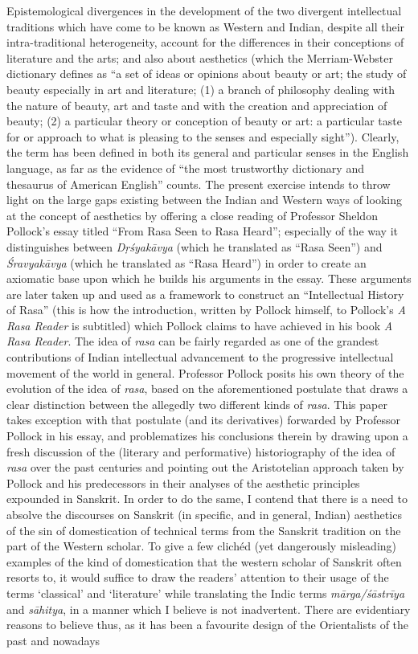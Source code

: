Epistemological divergences in the development of the two divergent intellectual traditions which have come to be known as Western and Indian, despite all their intra-traditional heterogeneity, account for the differences in their conceptions of literature and the arts; and also about aesthetics (which the Merriam-Webster dictionary defines as “a set of ideas or opinions about beauty or art; the study of beauty especially in art and literature; (1) a branch of philosophy dealing with the nature of beauty, art and taste and with the creation and appreciation of beauty; (2) a particular theory or conception of beauty or art: a particular taste for or approach to what is pleasing to the senses and especially sight”). Clearly, the term has been defined in both its general and particular senses in the English language, as far as the evidence of “the most trustworthy dictionary and thesaurus of American English” counts. The present exercise intends to throw light on the large gaps existing between the Indian and Western ways of looking at the concept of aesthetics by offering a close reading of Professor Sheldon Pollock’s essay titled “From Rasa Seen to Rasa Heard”; especially of the way it distinguishes between \textsl{Dṛśyakāvya} (which he translated as “Rasa Seen”) and \textsl{Śravyakāvya} (which he translated as “Rasa Heard”) in order to create an axiomatic base upon which he builds his arguments in the essay. These arguments are later taken up and used as a framework to construct an “Intellectual History of Rasa” (this is how the introduction, written by Pollock himself, to Pollock’s \textsl{A Rasa Reader} is subtitled) which Pollock claims to have achieved in his book \textsl{A Rasa Reader}. The idea of \textsl{rasa} can be fairly regarded as one of the grandest contributions of Indian intellectual advancement to the progressive intellectual movement of the world in general. Professor Pollock posits his own theory of the evolution of the idea of \textsl{rasa}, based on the aforementioned postulate that draws a clear distinction between the allegedly two different kinds of \textsl{rasa}. This paper takes exception with that postulate (and its derivatives) forwarded by Professor Pollock in his essay, and problematizes his conclusions therein by drawing upon a fresh discussion of the (literary and performative) historiography of the idea of \textsl{rasa} over the past centuries and pointing out the Aristotelian approach taken by Pollock and his predecessors in their analyses of the aesthetic principles expounded in Sanskrit. In order to do the same, I contend that there is a need to absolve the discourses on Sanskrit (in specific, and in general, Indian) aesthetics of the sin of domestication of technical terms from the Sanskrit tradition on the part of the Western scholar. To give a few clichéd (yet dangerously misleading) examples of the kind of domestication that the western scholar of Sanskrit often resorts to, it would suffice to draw the readers’ attention to their usage of the terms ‘classical’ and ‘literature’ while translating the Indic terms \textsl{mārga/śāstrīya} and \textsl{sāhitya}, in a manner which I believe is not inadvertent. There are evidentiary reasons to believe thus, as it has been a favourite design of the Orientalists of the past and nowadays 